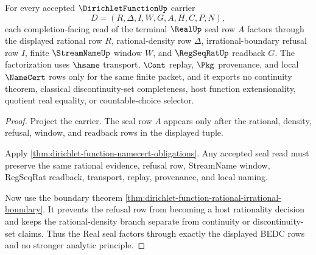 \begin{theorem}
\label{thm:dirichlet-function-real-seal-factorization}
For every accepted $\DirichletFunctionUp$ carrier
$$
D=(R,\Delta,I,W,G,A,H,C,P,N),
$$
each completion-facing read of the terminal $\RealUp$ seal row $A$ factors through the displayed rational row $R$, rational-density row $\Delta$, irrational-boundary refusal row $I$, finite $\StreamNameUp$ window $W$, and $\RegSeqRatUp$ readback $G$. The factorization uses $\hsame$ transport, $\Cont$ replay, $\Pkg$ provenance, and local $\NameCert$ rows only for the same finite packet, and it exports no continuity theorem, classical discontinuity-set completeness, host function extensionality, quotient real equality, or countable-choice selector.
\end{theorem}
\begin{proof}
Project the carrier. The seal row $A$ appears only after the rational, density, refusal, window, and readback rows in the displayed tuple.

Apply \autoref{thm:dirichlet-function-namecert-obligations}. Any accepted seal read must preserve the same rational evidence, refusal row, StreamName window, RegSeqRat readback, transport, replay, provenance, and local naming.

Now use the boundary theorem \autoref{thm:dirichlet-function-rational-irrational-boundary}. It prevents the refusal row from becoming a host rationality decision and keeps the rational-density branch separate from continuity or discontinuity-set claims. Thus the Real seal factors through exactly the displayed BEDC rows and no stronger analytic principle.
\end{proof}


\begin{closurestatus}{\DirichletFunctionUp}
  \theoryclosure{\seedClosure}
  \formalstatus{\unformalizedV}
\end{closurestatus}
